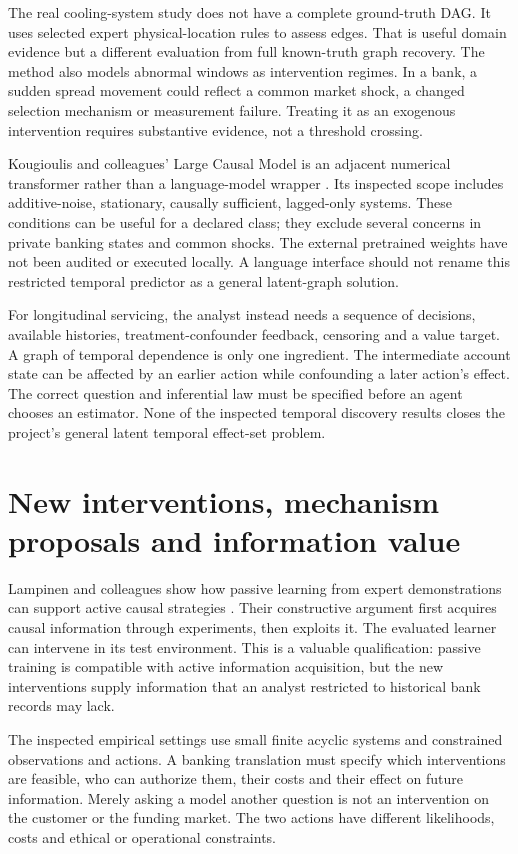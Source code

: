 The real cooling-system study does not have a complete ground-truth DAG. It
uses selected expert physical-location rules to assess edges. That is useful
domain evidence but a different evaluation from full known-truth graph
recovery. The method also models abnormal windows as intervention regimes.
In a bank, a sudden spread movement could reflect a common market shock, a
changed selection mechanism or measurement failure. Treating it as an
exogenous intervention requires substantive evidence, not a threshold crossing.

Kougioulis and colleagues' Large Causal Model is an adjacent numerical
transformer rather than a language-model wrapper
\cite{v12_la_2602_18662}. Its inspected scope includes additive-noise,
stationary, causally sufficient, lagged-only systems. These conditions can be
useful for a declared class; they exclude several concerns in private banking
states and common shocks. The external pretrained weights have not been
audited or executed locally. A language interface should not rename this
restricted temporal predictor as a general latent-graph solution.

For longitudinal servicing, the analyst instead needs a sequence of decisions,
available histories, treatment-confounder feedback, censoring and a value
target. A graph of temporal dependence is only one ingredient. The
intermediate account state can be affected by an earlier action while
confounding a later action's effect. The correct question and inferential law
must be specified before an agent chooses an estimator. None of the inspected
temporal discovery results closes the project's general latent temporal
effect-set problem.

\section{New interventions, mechanism proposals and information value}

Lampinen and colleagues show how passive learning from expert demonstrations
can support active causal strategies \cite{v12_la_2305_16183}. Their
constructive argument first acquires causal information through experiments,
then exploits it. The evaluated learner can intervene in its test environment.
This is a valuable qualification: passive training is compatible with active
information acquisition, but the new interventions supply information that an
analyst restricted to historical bank records may lack.

The inspected empirical settings use small finite acyclic systems and
constrained observations and actions. A banking translation must specify which
interventions are feasible, who can authorize them, their costs and their
effect on future information. Merely asking a model another question is not
an intervention on the customer or the funding market. The two actions have
different likelihoods, costs and ethical or operational constraints.

